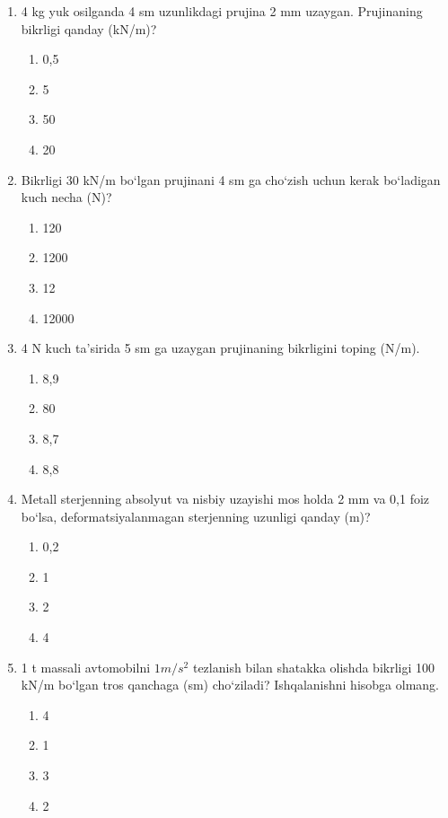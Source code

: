 \begin{enumerate}
\item 4 kg yuk osilganda 4 sm uzunlikdagi prujina 2 mm uzaygan. Prujinaning bikrligi qanday (kN/m)?
\begin{enumerate}[label=\Alph*)]
\item 0,5
\item 5
\item 50
\item 20
\end{enumerate}

\item Bikrligi 30 kN/m bo‘lgan prujinani 4 sm ga cho‘zish uchun kerak bo‘ladigan kuch necha (N)?
\begin{enumerate}[label=\Alph*)]
\item 120
\item 1200
\item 12
\item 12000
\end{enumerate}

\item 4 N kuch ta’sirida 5 sm ga uzaygan prujinaning bikrligini toping (N/m).
\begin{enumerate}[label=\Alph*)]
\item 8,9
\item 80
\item 8,7
\item 8,8
\end{enumerate}

\item Metall sterjenning absolyut va nisbiy uzayishi mos holda 2 mm va 0,1 foiz bo‘lsa, deformatsiyalanmagan sterjenning uzunligi qanday (m)?
\begin{enumerate}[label=\Alph*)]
\item 0,2
\item 1
\item 2
\item 4
\end{enumerate}

\item 1 t massali avtomobilni $1 m/s^2$ tezlanish bilan shatakka olishda bikrligi 100 kN/m bo‘lgan tros qanchaga (sm) cho‘ziladi? Ishqalanishni hisobga olmang.
\begin{enumerate}[label=\Alph*)]
\item 4
\item 1
\item 3
\item 2
\end{enumerate}


\end{enumerate}
